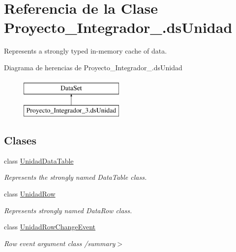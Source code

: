 \hypertarget{class_proyecto___integrador__3_1_1ds_unidad}{\section{Referencia de la Clase Proyecto\-\_\-\-Integrador\-\_.\-ds\-Unidad}
\label{class_proyecto___integrador__3_1_1ds_unidad}
}


Represents a strongly typed in-\/memory cache of data.  


Diagrama de herencias de Proyecto\-\_\-\-Integrador\-\_.\-ds\-Unidad\begin{figure}[H]
\begin{center}
\leavevmode
\includegraphics[height=2.000000cm]{d1/d85/class_proyecto___integrador__3_1_1ds_unidad}
\end{center}
\end{figure}
\subsection*{Clases}
\begin{DoxyCompactItemize}
\item 
class \hyperlink{class_proyecto___integrador__3_1_1ds_unidad_1_1_unidad_data_table}{Unidad\-Data\-Table}
\begin{DoxyCompactList}\small\item\em Represents the strongly named Data\-Table class. \end{DoxyCompactList}\item 
class \hyperlink{class_proyecto___integrador__3_1_1ds_unidad_1_1_unidad_row}{Unidad\-Row}
\begin{DoxyCompactList}\small\item\em Represents strongly named Data\-Row class. \end{DoxyCompactList}\item 
class \hyperlink{class_proyecto___integrador__3_1_1ds_unidad_1_1_unidad_row_change_event}{Unidad\-Row\-Change\-Event}
\begin{DoxyCompactList}\small\item\em Row event argument class /summary$>$ \end{DoxyCompactList}\end{DoxyCompactItemize}
